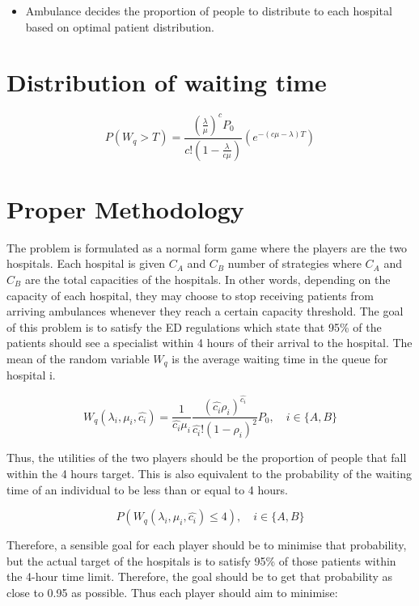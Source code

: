 \documentclass{article}
\begin{document}
\begin{itemize}
    \item Ambulance decides the proportion of people to distribute to each hospital based on optimal patient distribution.
\end{itemize}


\section{Distribution of waiting time}
\begin{equation}
    P(W_q > T) = \frac{(\frac{\lambda}{\mu})^c P_0}{c!(1-\frac{\lambda}{c \mu})} (e^{-(c \mu - \lambda)T})
\end{equation}



\newpage
\section{Proper Methodology}
The problem is formulated as a normal form game where the players are the two hospitals. Each hospital is given \( C_A \) and \( C_B \) number of strategies where \( C_A \) and \( C_B \) are the total capacities of the hospitals. In other words, depending on the capacity of each hospital, they may choose to stop receiving patients from arriving ambulances whenever they reach a certain capacity threshold. The goal of this problem is to satisfy the ED regulations which state that 95\% of the patients should see a specialist within 4 hours of their arrival to the hospital. The mean of the random variable \( W_q \) is the average waiting time in the queue for hospital i.


\begin{equation}
     W_q(\lambda_i, \mu_i, \hat{c_i}) = \frac{1}{\hat{c_i} \mu_i} \frac{(\hat{c_i} \rho_i) ^ {\hat{c_i}}}{\hat{c_i}! (1 - \rho_i) ^ 2}P_0, \quad i \in \{A,B\}
\end{equation}

Thus, the utilities of the two players should be the proportion of people that fall within the 4 hours target. This is also equivalent to the probability of the waiting time of an individual to be less than or equal to 4 hours. 

\begin{equation}
    P(W_q(\lambda_i, \mu_i, \hat{c_i}) \leq 4), \quad i \in \{A,B\}
\end{equation}

Therefore, a sensible goal for each player should be to minimise that probability, but the actual target of the hospitals is to satisfy 95\% of those patients within the 4-hour time limit. Therefore, the goal should be to get that probability as close to 0.95 as possible. Thus each player should aim to minimise:
\end{document}
